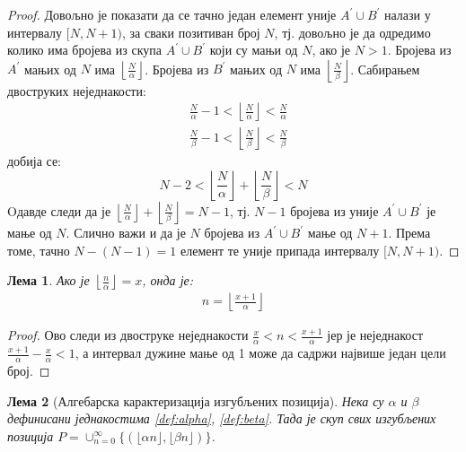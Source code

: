 \documentclass[a4paper]{article}
\newtheorem{lemma}{Лема}
\begin{document}
\begin{proof}
	Довољно је показати да се тачно један елемент уније $ A^{'} \cup B^{'} $ налази у интервалу $ [N,N+1) $, за сваки позитиван број $ N $, тј. довољно је да одредимо колико има бројева из скупа $ A^{'} \cup B^{'} $ који су мањи од $ N $, ако је $ N > 1 $. Бројева из $ A^{'} $ мањих од $ N $ има $ \left\lfloor \frac{N}{\alpha} \right\rfloor $. Бројева из $ B^{'} $ мањих од $ N $ има $ \left\lfloor \frac{N}{\beta} \right\rfloor $. Сабирањем двоструких неједнакости:
		\begin{eqnarray*}
			&\frac{N}{\alpha} - 1 < \left\lfloor \frac{N}{\alpha} \right\rfloor < \frac{N}{\alpha}\\
			&\frac{N}{\beta} - 1 < \left\lfloor \frac{N}{\beta} \right\rfloor < \frac{N}{\beta}
		\end{eqnarray*}	
	добија се:
		\begin{displaymath}
		N - 2 < \left\lfloor \frac{N}{\alpha} \right\rfloor + \left\lfloor \frac{N}{\beta} \right\rfloor < N
		\end{displaymath} 	
	Oдавде следи да је $ \left\lfloor \frac{N}{\alpha} \right\rfloor + \left\lfloor \frac{N}{\beta} \right\rfloor = N - 1 $, тј. $ N - 1 $ бројева из уније $ A^{'} \cup B^{'} $ је мање од $ N $. Слично важи и да је $ N $ бројева из $ A^{'} \cup B^{'} $ мање од $ N + 1 $. Према томе, тачно $ N - (N - 1) = 1 $ елемент те уније припада интервалу $ [N,N+1) $.
\end{proof}

\begin{lemma}
	\label{lemma:n}
	Ако је $ \left\lfloor \frac{n}{\alpha} \right\rfloor = x $, онда је:
		\begin{eqnarray*}
			n = \left\lfloor \frac{x+1}{\alpha} \right\rfloor
		\end{eqnarray*}
\end{lemma}

\begin{proof}
	Ово следи из двоструке неједнакости $ \frac{x}{\alpha}<n<\frac{x+1}{\alpha} $ јер је неједнакост $ \frac{x+1}{\alpha} - \frac{x}{\alpha} < 1 $, а интервал дужине мање од 1 може да садржи највише један цели број.
\end{proof}

\begin{lemma}[Алгебарска карактеризација изгубљених позиција] Нека су $ \alpha $ и $ \beta $ дефинисани једнакостима \eqref{def:alpha}, \eqref{def:beta}. Тада је скуп свих изгубљених позиција $ P = \cup_{n=0}^{\infty} \{(\lfloor \alpha n \rfloor, \lfloor \beta n \rfloor)\} $.
\end{lemma}
\end{document}
